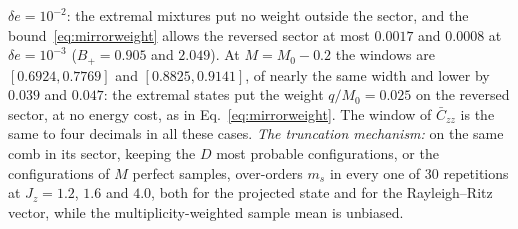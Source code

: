 \documentclass[aps,prx,onecolumn,10pt,nofootinbib,longbibliography,floatfix]{revtex4-2}
\theoremstyle{remark}
\newcommand{\Jz}{J_z}
\newcommand{\ms}{m_s}
\newcommand{\Czz}{\bar C_{zz}}
\newcommand{\de}{\delta e}
\begin{document}
\begin{itemize}
$\de=10^{-2}$: the extremal mixtures put no weight outside the sector, and the bound~\eqref{eq:mirrorweight} allows %
the reversed sector at most $0.0017$ and $0.0008$ at $\de=10^{-3}$ ($B_+=0.905$ and $2.049$). At $M=M_0-0.2$ the windows are %
$[0.6924,0.7769]$ and $[0.8825,0.9141]$, of nearly the same width and lower by $0.039$ and $0.047$: the extremal %
states put the weight $q/M_0=0.025$ on the reversed sector, at no energy cost, as in %
Eq.~\eqref{eq:mirrorweight}. The window
of $\Czz$ is the same to four decimals in all these cases. \emph{The truncation mechanism:} on the same comb in its sector,
keeping the $D$ most probable configurations, or the configurations of $M$ perfect samples, over-orders $\ms$ in %
every one of $30$ repetitions at $\Jz=1.2$, $1.6$ and $4.0$, both for the projected state and for the Rayleigh--Ritz %
vector, while the multiplicity-weighted sample mean is unbiased.
\end{itemize}

\def\SMcap{Representative rows of check T3: exact two-sided width $w$ of an average label at a fixed error per site %
$\de$, for growing system size $n$. Read down each block: an intensive width (Theorem~2) barely changes with $n$, also %
above the gap ($\epsilon/\Delta>1$, with $\epsilon=n\de$ and $\Delta$ the gap); the unpinned periodic chain (last %
block) is the exception that Theorem~3 predicts, and its width grows. The comb has an extensively pinned sector, like %
the dataset. Last column: whether the lower bound of Ref.~\cite{manchanda2026} (its Thm.~2, valid for %
$\epsilon\le\bar\Delta_O/2$) applies at that point, as evaluated in the output file (\emph{not evaluated}: the file %
does not evaluate it at that size). Widths are given to four significant digits because the point of the table is
their change with $n$. Source: \texttt{paper/data/r3gen/out/t3\_*.txt}.}\def\SMlab{tab:t3} %

\end{document}
